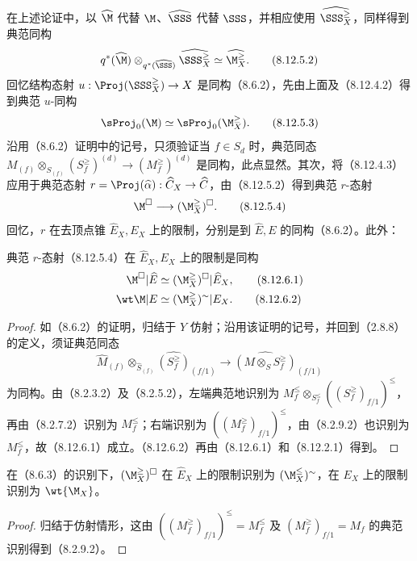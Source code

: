 在上述论证中，以 $\widehat\M$ 代替 $\M$、$\widehat\SSS$ 代替 $\SSS$，并相应使用 $\widehat{\SSS_X^{\geq}}$，同样得到典范同构
\begin{equation}q^*(\widehat\M)\otimes_{q^*(\widehat\SSS)}\widehat{\SSS_X^{\geq}}
\simeq\widehat{\M_X^{\geq}}.\tag{8.12.5.2}\end{equation}
回忆结构态射 $u:\Proj(\SSS_X^{\geq})\to X$ 是同构（8.6.2），先由上面及（8.12.4.2）得到典范 $u$-同构
\begin{equation}\sProj_0(\M)\simeq\sProj_0(\M_X^{\geq}).\tag{8.12.5.3}\end{equation}
沿用（8.6.2）证明中的记号，只须验证当 $f\in S_d$ 时，典范同态 $M_{(f)}\otimes_{S_{(f)}}(S_f^{\geq})^{(d)}\to(M_f^{\geq})^{(d)}$ 是同构，此点显然。其次，将（8.12.4.3）应用于典范态射 $r=\Proj(\widehat\alpha):\widehat C_X\to\widehat C$，由（8.12.5.2）得到典范 $r$-态射
\begin{equation}\M^\square\longrightarrow(\M_X^{\geq})^\square.\tag{8.12.5.4}\end{equation}
回忆，$r$ 在去顶点锥 $\widehat E_X,E_X$ 上的限制，分别是到 $\widehat E,E$ 的同构（8.6.2）。此外：

 典范 $r$-态射（8.12.5.4）在 $\widehat E_X,E_X$ 上的限制是同构
\begin{align}
\M^\square|\widehat E&\simeq(\M_X^{\geq})^\square|\widehat E_X,\tag{8.12.6.1}\\
\wt\M|E&\simeq(\M_X^{\geq})^{\sim}|E_X.\tag{8.12.6.2}
\end{align}
\begin{proof}
如（8.6.2）的证明，归结于 $Y$ 仿射；沿用该证明的记号，并回到（2.8.8）的定义，须证典范同态
\[\widehat M_{(f)}\otimes_{\widehat S_{(f)}}\widehat{(S_f^{\geq})}_{(f/1)}
\longrightarrow\widehat{(M\otimes_S S_f^{\geq})}_{(f/1)}\]
为同构。由（8.2.3.2）及（8.2.5.2），左端典范地识别为 $M_f^{\leq}\otimes_{S_f^{\leq}}((S_f^{\geq})_{f/1})^{\leq}$，再由（8.2.7.2）识别为 $M_f^{\leq}$；右端识别为 $((M_f^{\geq})_{f/1})^{\leq}$，由（8.2.9.2）也识别为 $M_f^{\leq}$，故（8.12.6.1）成立。（8.12.6.2）再由（8.12.6.1）和（8.12.2.1）得到。
\end{proof}

 在（8.6.3）的识别下，$(\M_X^{\geq})^\square$ 在 $\widehat E_X$ 上的限制识别为 $(\M_X^{\leq})^{\sim}$，在 $E_X$ 上的限制识别为 $\wt{\M_X}$。
\begin{proof}
归结于仿射情形，这由 $((M_f^{\geq})_{f/1})^{\leq}=M_f^{\leq}$ 及 $(M_f^{\geq})_{f/1}=M_f$ 的典范识别得到（8.2.9.2）。
\end{proof}

